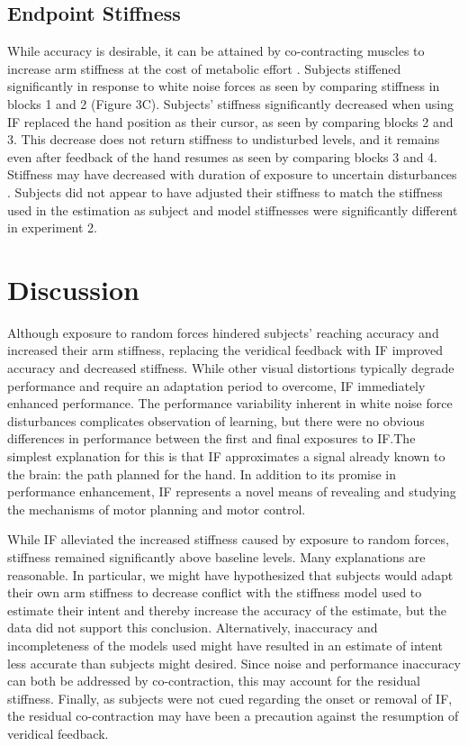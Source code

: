 \documentclass{frontiersSCNS} %
\begin{document}
\subsection*{Endpoint Stiffness}
While accuracy is desirable, it can be attained by co-contracting muscles to increase arm stiffness at the cost of metabolic effort \citep{gribble2003role, takahashi2001impedance}. Subjects stiffened significantly in response to white noise forces as seen by comparing stiffness in blocks 1 and 2 (Figure 3C). Subjects' stiffness significantly decreased when using IF replaced the hand position as their cursor, as seen by comparing blocks 2 and 3. This decrease does not return stiffness to undisturbed levels, and it remains even after feedback of the hand resumes as seen by comparing blocks 3 and 4. Stiffness may have decreased with duration of exposure to uncertain disturbances \citep{takahashi2001impedance}. Subjects did not appear to have adjusted their stiffness to match the stiffness used in the estimation as subject and model stiffnesses were significantly different in experiment 2.

\section{Discussion}

Although exposure to random forces hindered subjects’ reaching accuracy and increased their arm stiffness, replacing the veridical feedback with IF improved accuracy and decreased stiffness. While other visual distortions typically degrade performance and require an adaptation period to overcome, IF immediately enhanced performance. The performance variability inherent in white noise force disturbances complicates observation of learning, but there were no obvious differences in performance between the first and final exposures to IF.The simplest explanation for this is that IF approximates a signal already known to the brain: the path planned for the hand. In addition to its promise in performance enhancement, IF represents a novel means of revealing and studying the mechanisms of motor planning and motor control.

While IF alleviated the increased stiffness caused by exposure to random forces, stiffness remained significantly above baseline levels. Many explanations are reasonable. In particular, we might have hypothesized that subjects would adapt their own arm stiffness to decrease conflict with the stiffness model used to estimate their intent and thereby increase the accuracy of the estimate, but the data did not support this conclusion. Alternatively, inaccuracy and incompleteness of the models used might have resulted in an estimate of intent less accurate than subjects might desired. Since noise and performance inaccuracy can both be addressed by co-contraction, this may account for the residual stiffness. Finally, as subjects were not cued regarding the onset or removal of IF, the residual co-contraction may have been a precaution against the resumption of veridical feedback.
\end{document}
